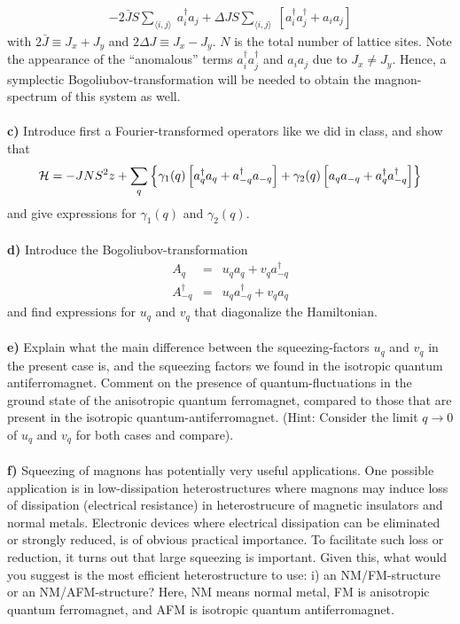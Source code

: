 \begin{problem}
\begin{eqnarray}
	- 2 \bar{J} S  \sum_{\langle i,j \rangle} ~  a^{\dagger}_i a_j 
	+ \Delta J S \sum_{\langle i,j \rangle} ~  \left[  a^{\dagger}_i a^{\dagger}_j +  a_i a_j \right] \nonumber 
\end{eqnarray}
with $2 \bar{J} \equiv J_x+J_y$ and $2  \Delta J \equiv J_x-J_y$. $N$ is the total number of lattice sites. Note the appearance of the ``anomalous'' terms 
$a^{\dagger}_i a^{\dagger}_j $ and $a_i a_j$ due to 
$J_x \neq J_y$.  Hence, a symplectic Bogoliubov-transformation will be needed to obtain the magnon-spectrum of this system as well. 
\ \\
\ \\
{\bf c)} Introduce first a Fourier-transformed operators like we did in class, and show that 
\begin{eqnarray}
	\mathcal{H} = -J N S^2 z + \sum_{q}\left\{  \gamma_1(q) \left[ a^{\dagger}_q a_q + a^{\dagger}_{-q} a_{-q}  \right] +  \gamma_2(q) \left[ a_q a_{-q} + a^{\dagger}_{q} a^{\dagger}_{-q}  \right]\right\} \nonumber 
\end{eqnarray}
and give expressions for $\gamma_1(q)$ and $\gamma_2(q)$.
\ \\
\ \\
{\bf d)} Introduce the Bogoliubov-transformation
\begin{eqnarray}
	A_{q} & = & u_q a_q + v_q a^{\dagger}_{-q}  \nonumber \\
	A^{\dagger}_{-q} & = & u_q a^{\dagger}_{-q} + v_q a_{q}  \nonumber
\end{eqnarray}
and find expressions for $u_q$ and $v_q$ that diagonalize the Hamiltonian. 
\ \\
\ \\
{\bf e)} Explain what the main difference between the squeezing-factors  $u_q$ and $v_q$ in the present case is, and the squeezing factors we found in the isotropic quantum antiferromagnet.  Comment on the presence of quantum-fluctuations in the ground state of the anisotropic quantum ferromagnet, compared to those that are present in the isotropic quantum-antiferromagnet. (Hint: Consider the limit $q \to 0$ of $u_q$ and $v_q$ for both cases
and compare). 
\ \\
\ \\
{\bf f)} Squeezing of magnons has potentially very useful applications. One possible application is in low-dissipation heterostructures where magnons may induce loss of dissipation (electrical resistance) in heterostrucure of magnetic insulators and normal metals.  Electronic devices where electrical dissipation can be eliminated or strongly reduced, is of obvious practical importance. To facilitate such loss or reduction, it turns out that large squeezing is important. Given this, what would you suggest is the most efficient heterostructure to use: i) an NM/FM-structure or an NM/AFM-structure? Here, NM means normal metal, FM is anisotropic quantum ferromagnet, and AFM is isotropic quantum antiferromagnet.    
\end{problem}


